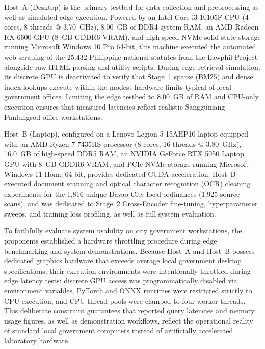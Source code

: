     Host~A (Desktop) is the primary testbed for data collection and preprocessing as well as simulated edge execution. Powered by an Intel Core i3-10105F CPU (4 cores, 8 threads @ 3.70~GHz), 8.00~GB of DDR4 system RAM, an AMD Radeon RX 6600 GPU (8~GB GDDR6 VRAM), and high-speed NVMe solid-state storage running Microsoft Windows 10 Pro 64-bit, this machine executed the automated web scraping of the 25,432 Philippine national statutes from the Lawphil Project alongside raw HTML parsing and utility scripts. During edge retrieval simulation, its discrete GPU is deactivated to verify that Stage~1 sparse (BM25) and dense index lookups execute within the modest hardware limits typical of local government offices. Limiting the edge testbed to 8.00~GB of RAM and CPU-only execution ensures that measured latencies reflect realistic Sangguniang Panlungsod office workstations.

    Host~B (Laptop), configured on a Lenovo Legion 5 15AHP10 laptop equipped with an AMD Ryzen 7 7435HS processor (8 cores, 16 threads @ 3.80~GHz), 16.0~GB of high-speed DDR5 RAM, an NVIDIA GeForce RTX 5050 Laptop GPU with 8~GB GDDR6 VRAM, and PCIe NVMe storage running Microsoft Windows 11 Home 64-bit, provides dedicated CUDA acceleration. Host~B executed document scanning and optical character recognition (OCR) cleaning experiments for the 1,816 unique Davao City local ordinances (1,925 source scans), and was dedicated to Stage~2 Cross-Encoder fine-tuning, hyperparameter sweeps, and training loss profiling, as well as full system evaluation.

    To faithfully evaluate system usability on city government workstations, the proponents established a hardware throttling procedure during edge benchmarking and system demonstrations. Because Host~A and Host~B possess dedicated graphics hardware that exceeds average local government desktop specifications, their execution environments were intentionally throttled during edge latency tests: discrete GPU access was programmatically disabled via environment variables, PyTorch and ONNX runtimes were restricted strictly to CPU execution, and CPU thread pools were clamped to four worker threads. This deliberate constraint guarantees that reported query latencies and memory usage figures, as well as demonstration workflows, reflect the operational reality of standard local government computers instead of artificially accelerated laboratory hardware.

